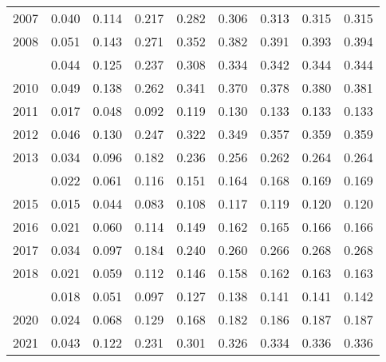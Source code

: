 \documentclass[
]{article}
\begin{document}
\begin{longtable}[t]{lrrrrrrrr}
2007 & 0.040 & 0.114 & 0.217 & 0.282 & 0.306 & 0.313 & 0.315 & 0.315\\
2008 & 0.051 & 0.143 & 0.271 & 0.352 & 0.382 & 0.391 & 0.393 & 0.394\\
\addlinespace
2009 & 0.044 & 0.125 & 0.237 & 0.308 & 0.334 & 0.342 & 0.344 & 0.344\\
2010 & 0.049 & 0.138 & 0.262 & 0.341 & 0.370 & 0.378 & 0.380 & 0.381\\
2011 & 0.017 & 0.048 & 0.092 & 0.119 & 0.130 & 0.133 & 0.133 & 0.133\\
2012 & 0.046 & 0.130 & 0.247 & 0.322 & 0.349 & 0.357 & 0.359 & 0.359\\
2013 & 0.034 & 0.096 & 0.182 & 0.236 & 0.256 & 0.262 & 0.264 & 0.264\\
\addlinespace
2014 & 0.022 & 0.061 & 0.116 & 0.151 & 0.164 & 0.168 & 0.169 & 0.169\\
2015 & 0.015 & 0.044 & 0.083 & 0.108 & 0.117 & 0.119 & 0.120 & 0.120\\
2016 & 0.021 & 0.060 & 0.114 & 0.149 & 0.162 & 0.165 & 0.166 & 0.166\\
2017 & 0.034 & 0.097 & 0.184 & 0.240 & 0.260 & 0.266 & 0.268 & 0.268\\
2018 & 0.021 & 0.059 & 0.112 & 0.146 & 0.158 & 0.162 & 0.163 & 0.163\\
\addlinespace
2019 & 0.018 & 0.051 & 0.097 & 0.127 & 0.138 & 0.141 & 0.141 & 0.142\\
2020 & 0.024 & 0.068 & 0.129 & 0.168 & 0.182 & 0.186 & 0.187 & 0.187\\
2021 & 0.043 & 0.122 & 0.231 & 0.301 & 0.326 & 0.334 & 0.336 & 0.336\\*
\end{longtable}
\end{document}
